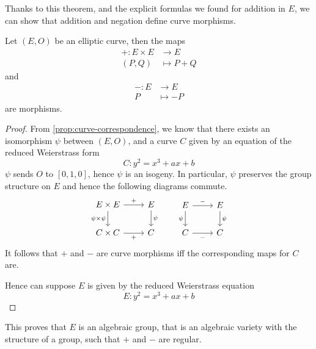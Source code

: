 
Thanks to this theorem, and the explicit formulas we found for addition
in $E$, we can show that addition and negation define curve morphisms.
\begin{theorem}
	\label{thm:group-morphism}
	Let $(E,O)$ be an elliptic curve, then the maps
	\begin{align*}
		+ : E\times E &\to E\\
		(P, Q) &\mapsto P + Q
	\end{align*}
	and
	\begin{align*}
		-: E &\to E\\
		P &\mapsto -P
	\end{align*}
	are morphisms.
\end{theorem}

\begin{proof}
	From \ref{prop:curve-correspondence}, we know that there exists an
	isomorphism $\psi$ between $(E, O)$, and a curve $C$ given by an equation
	of the reduced Weierstrass form
	\begin{equation*}
		C: y^2 = x^3 + ax + b
	\end{equation*}
	$\psi$ sends $O$ to $[0, 1, 0]$, hence $\psi$ is an isogeny.
	In particular, $\psi$ preserves the group structure on $E$ and hence
	the following diagrams commute.
	\begin{equation*}
		\begin{tikzcd}
			{E\times E} & {E} \\
			{C\times C} & {C}
			\arrow["{\psi\times\psi}"', from=1-1, to=2-1]
			\arrow["{+}"', from=2-1, to=2-2]
			\arrow["{+}", from=1-1, to=1-2]
			\arrow["{\psi}", from=1-2, to=2-2]
		\end{tikzcd}
		\qquad
		\begin{tikzcd}
			{E} & {E} \\
			{C} & {C}
			\arrow["\psi"', from=1-1, to=2-1]
			\arrow["{-}"', from=2-1, to=2-2]
			\arrow["{-}", from=1-1, to=1-2]
			\arrow["{\psi}", from=1-2, to=2-2]
		\end{tikzcd}	
	\end{equation*}
	It follows that $+$ and $-$ are curve morphisms iff the corresponding maps
	for $C$ are.

	Hence can suppose $E$ is given by
	the reduced Weierstrass equation
	\begin{equation*}
		E: y^2 = x^3 + ax + b
	\end{equation*}
\end{proof}
This proves that $E$ is an algebraic group, that is an algebraic variety
with the structure of a group, such that $+$ and $-$ are regular.


